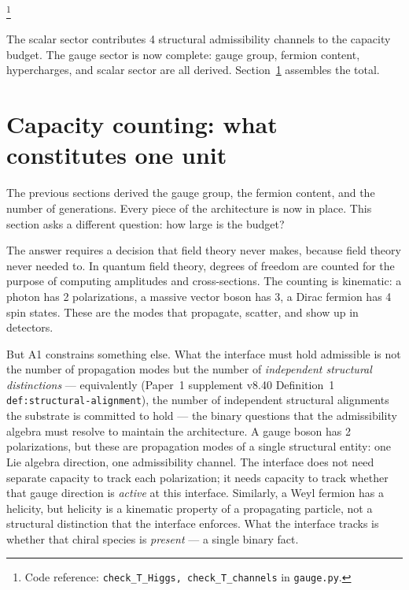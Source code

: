 \documentclass[11pt]{article}
\newcommand{\coderef}[2]{\footnote{Code reference: \texttt{#1} in \texttt{#2}.}}
\begin{document}
\coderef{check\_T\_Higgs, check\_T\_channels}{gauge.py}

The scalar sector contributes 4 structural admissibility channels to the capacity budget.  The gauge sector is now complete: gauge group, fermion content, hypercharges, and scalar sector are all derived.  Section~\ref{sec:counting} assembles the total.


\section{Capacity counting: what constitutes one unit}
\label{sec:counting}

The previous sections derived the gauge group, the fermion content, and the number of generations.  Every piece of the architecture is now in place.  This section asks a different question: how large is the budget?

The answer requires a decision that field theory never makes, because field theory never needed to.  In quantum field theory, degrees of freedom are counted for the purpose of computing amplitudes and cross-sections.  The counting is kinematic: a photon has 2 polarizations, a massive vector boson has 3, a Dirac fermion has 4 spin states.  These are the modes that propagate, scatter, and show up in detectors.

But A1 constrains something else.  What the interface must hold admissible is not the number of propagation modes but the number of \emph{independent structural distinctions} --- equivalently (Paper~1 supplement v8.40 Definition~1 \texttt{def:structural-alignment}), the number of independent structural alignments the substrate is committed to hold --- the binary questions that the admissibility algebra must resolve to maintain the architecture.  A gauge boson has 2 polarizations, but these are propagation modes of a single structural entity: one Lie algebra direction, one admissibility channel.  The interface does not need separate capacity to track each polarization; it needs capacity to track whether that gauge direction is \emph{active} at this interface.  Similarly, a Weyl fermion has a helicity, but helicity is a kinematic property of a propagating particle, not a structural distinction that the interface enforces.  What the interface tracks is whether that chiral species is \emph{present} --- a single binary fact.
\end{document}
